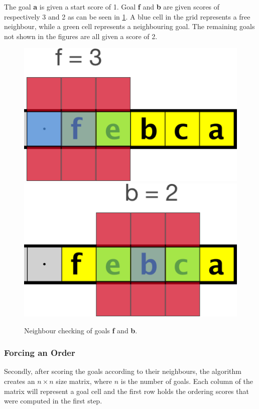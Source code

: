 The goal \textbf{a} is given a start score of 1.
Goal \textbf{f} and \textbf{b} are given scores of respectively 3 and 2 as can be seen in \cref{fig:grid2}.
A blue cell in the grid represents a free neighbour, while a green cell represents a neighbouring goal.
The remaining goals not shown in the figures are all given a score of 2.

\begin{figure}[h!]
  \centering
  \includegraphics[width=.5\columnwidth]{graphics/goal_pri_3.png}
  \includegraphics[width=.5\columnwidth]{graphics/goal_pri_2.png}
  \caption{\label{fig:grid2}Neighbour checking of goals \textbf{f} and \textbf{b}.}
\end{figure}

\subsubsection{Forcing an Order }
Secondly, after scoring the goals according to their neighbours, the algorithm creates an $n \times n$ size matrix, where $n$ is the number of goals.
Each column of the matrix will represent a goal cell and the first row holds the ordering scores that were computed in the first step.


